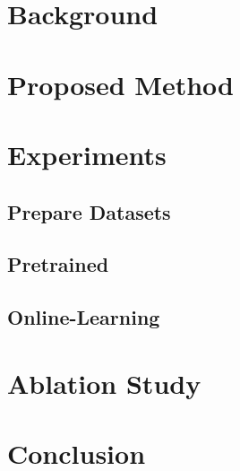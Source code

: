 \documentclass[lettersize,journal]{IEEEtran}
\begin{document}
	\section{Background}
	

	\section{Proposed Method}

	\section{Experiments}
		\subsection{Prepare Datasets}
		\subsection{Pretrained}
		\subsection{Online-Learning}

	\section{Ablation Study}%

	\section{Conclusion}%


	
\end{document}
